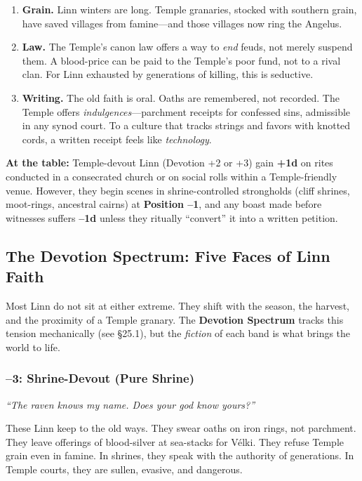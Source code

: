 \documentclass[11pt]{article}
\begin{document}
\begin{enumerate}
\item \textbf{Grain.} Linn winters are long. Temple granaries, stocked with southern grain, have saved villages from famine---and those villages now ring the Angelus.
\item \textbf{Law.} The Temple's canon law offers a way to \textit{end} feuds, not merely suspend them. A blood-price can be paid to the Temple's poor fund, not to a rival clan. For Linn exhausted by generations of killing, this is seductive.
\item \textbf{Writing.} The old faith is oral. Oaths are remembered, not recorded. The Temple offers \textit{indulgences}---parchment receipts for confessed sins, admissible in any synod court. To a culture that tracks strings and favors with knotted cords, a written receipt feels like \textit{technology}.
\end{enumerate}

\begin{mechanicbox}
\textbf{At the table:} Temple-devout Linn (Devotion +2 or +3) gain \textbf{+1d} on rites conducted in a consecrated church or on social rolls within a Temple-friendly venue. However, they begin scenes in shrine-controlled strongholds (cliff shrines, moot-rings, ancestral cairns) at \textbf{Position --1}, and any boast made before witnesses suffers \textbf{--1d} unless they ritually ``convert'' it into a written petition.
\end{mechanicbox}

\subsection{The Devotion Spectrum: Five Faces of Linn Faith}

Most Linn do not sit at either extreme. They shift with the season, the harvest, and the proximity of a Temple granary. The \textbf{Devotion Spectrum} tracks this tension mechanically (see §25.1), but the \textit{fiction} of each band is what brings the world to life.

\subsubsection{--3: Shrine-Devout (Pure Shrine)}

\emph{``The raven knows my name. Does your god know yours?''}

These Linn keep to the old ways. They swear oaths on iron rings, not parchment. They leave offerings of blood-silver at sea-stacks for Vélki. They refuse Temple grain even in famine. In shrines, they speak with the authority of generations. In Temple courts, they are sullen, evasive, and dangerous.
\end{document}
